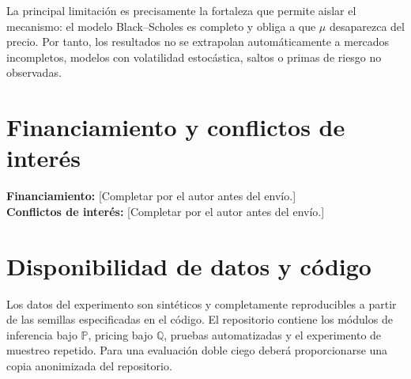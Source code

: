 \documentclass[12pt,letterpaper]{article}
\newcommand{\Pmeasure}{\mathbb{P}}
\newcommand{\Qmeasure}{\mathbb{Q}}
\begin{document}
La principal limitación es precisamente la fortaleza que permite aislar el mecanismo: el modelo Black--Scholes es completo y obliga a que $\mu$ desaparezca del precio. Por tanto, los resultados no se extrapolan automáticamente a mercados incompletos, modelos con volatilidad estocástica, saltos o primas de riesgo no observadas.

\section*{Financiamiento y conflictos de interés}

\textbf{Financiamiento:} [Completar por el autor antes del envío.]\\
\textbf{Conflictos de interés:} [Completar por el autor antes del envío.]

\section*{Disponibilidad de datos y código}

Los datos del experimento son sintéticos y completamente reproducibles a partir de las semillas especificadas en el código. El repositorio contiene los módulos de inferencia bajo $\Pmeasure$, pricing bajo $\Qmeasure$, pruebas automatizadas y el experimento de muestreo repetido. Para una evaluación doble ciego deberá proporcionarse una copia anonimizada del repositorio.
\end{document}
